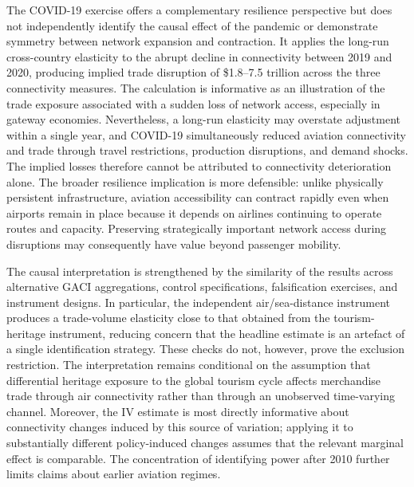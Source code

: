 The COVID-19 exercise offers a complementary resilience perspective but does
not independently identify the causal effect of the pandemic or demonstrate
symmetry between network expansion and contraction. It applies the long-run
cross-country elasticity to the abrupt decline in connectivity between 2019
and 2020, producing implied trade disruption of \$1.8--7.5 trillion across
the three connectivity measures. The calculation is informative as an illustration of
the trade exposure associated with a sudden loss of network access,
especially in gateway economies. Nevertheless, a long-run elasticity may
overstate adjustment within a single year, and COVID-19 simultaneously
reduced aviation connectivity and trade through travel restrictions,
production disruptions, and demand shocks. The implied losses therefore
cannot be attributed to connectivity deterioration alone. The broader
resilience implication is more defensible: unlike physically persistent
infrastructure, aviation accessibility can contract rapidly even when
airports remain in place because it depends on airlines continuing to operate
routes and capacity. Preserving strategically important network access during
disruptions may consequently have value beyond passenger mobility.

The causal interpretation is strengthened by the similarity of the results
across alternative GACI aggregations, control specifications, falsification
exercises, and instrument designs. In particular, the independent
air/sea-distance instrument produces a trade-volume elasticity close to that
obtained from the tourism-heritage instrument, reducing concern that the
headline estimate is an artefact of a single identification strategy. These
checks do not, however, prove the exclusion restriction. The interpretation
remains conditional on the assumption that differential heritage exposure to
the global tourism cycle affects merchandise trade through air connectivity
rather than through an unobserved time-varying channel. Moreover, the IV
estimate is most directly informative about connectivity changes induced by
this source of variation; applying it to substantially different
policy-induced changes assumes that the relevant marginal effect is
comparable. The concentration of identifying power after 2010 further limits
claims about earlier aviation regimes.

